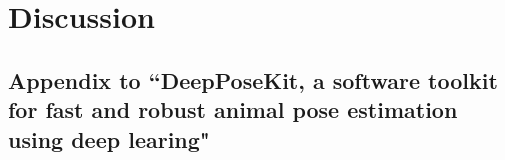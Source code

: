 \documentclass[11pt,a4paper,twoside]{book}
\begin{document}
\begin{doublespace}
\chapter*{Discussion}
\newpage

\begin{appendices}
\chapter[DeepPoseKit]{Appendix to ``DeepPoseKit, a software toolkit for fast and robust animal pose estimation using deep learing"}

    \label{app:figures}
    \begin{figure}[!htb]
    

\end{figure}
\end{appendices}
\end{doublespace}
\end{document}
